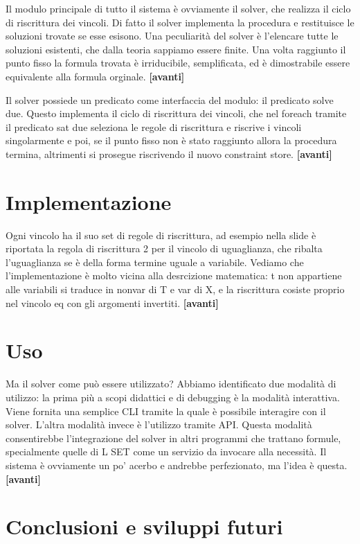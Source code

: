 \documentclass[11pt]{article}
\newcommand*{\nextslide}{\textbf{[avanti]}}
\begin{document}
Il modulo principale di tutto il sistema è ovviamente il solver, che
realizza il ciclo di riscrittura dei vincoli. Di fatto il solver
implementa la procedura \satset{} e restituisce le soluzioni trovate
se esse esisono. Una peculiarità del solver è l'elencare tutte le
soluzioni esistenti, che dalla teoria sappiamo essere finite. Una
volta raggiunto il punto fisso la formula trovata è irriducibile,
semplificata, ed è dimostrabile essere equivalente alla formula
orginale.  \nextslide{}

Il solver possiede un predicato come interfaccia del modulo: il
predicato solve due. Questo implementa il ciclo di riscrittura dei
vincoli, che nel foreach tramite il predicato sat due seleziona le
regole di riscrittura e riscrive i vincoli singolarmente e poi, se il
punto fisso non è stato raggiunto allora la procedura termina,
altrimenti si prosegue riscrivendo il nuovo constraint store.
\nextslide{}

\section*{Implementazione}

Ogni vincolo ha il suo set di regole di riscrittura, ad esempio nella
slide è riportata la regola di riscrittura 2 per il vincolo di
uguaglianza, che ribalta l'uguaglianza se è della forma termine uguale
a variabile. Vediamo che l'implementazione è molto vicina alla
desrcizione matematica: t non appartiene alle variabili si traduce in
nonvar di T e var di X, e la riscrittura cosiste proprio nel vincolo
eq con gli argomenti invertiti.  \nextslide{}

\section*{Uso}

Ma il solver come può essere utilizzato? Abbiamo identificato due
modalità di utilizzo: la prima più a scopi didattici e di debugging è
la modalità interattiva. Viene fornita una semplice CLI tramite la
quale è possibile interagire con il solver. L'altra modalità invece è
l'utilizzo tramite API. Questa modalità consentirebbe l'integrazione
del solver in altri programmi che trattano formule, specialmente
quelle di L SET come un servizio da invocare alla necessità. Il
sistema è ovviamente un po' acerbo e andrebbe perfezionato, ma l'idea
è questa.  \nextslide{}

\section*{Conclusioni e sviluppi futuri}
\end{document}
